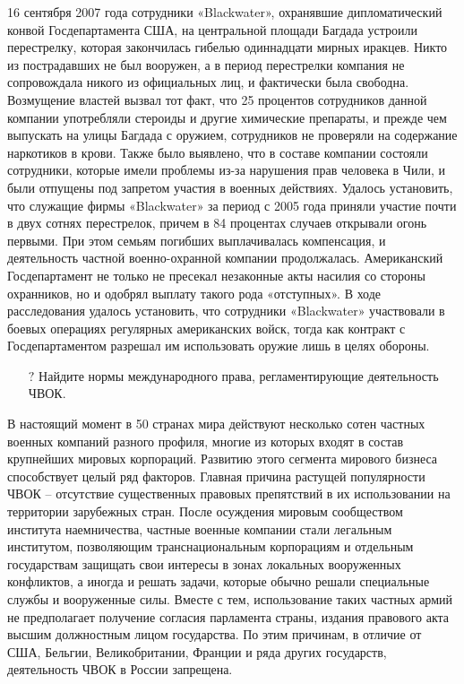 \documentclass[a4paper,12pt,fleqn]{article} %
\begin{document}
\begin{tcolorbox}[colback=blue!55!red!5!,colframe=blue!55!red,enforce breakable,%
	pad at break=1mm, title=Кейс 33. Действия частной компании в зоне конфликта]
	
	
  16 сентября 2007 года сотрудники «Blackwater», охранявшие дипломатический конвой Госдепартамента США, на центральной площади Багдада устроили перестрелку, которая закончилась гибелью одиннадцати мирных иракцев. Никто из пострадавших не был вооружен, а в период перестрелки компания не сопровождала никого из официальных лиц, и фактически была свободна. Возмущение властей вызвал тот факт, что 25 процентов сотрудников  данной компании употребляли стероиды и другие химические препараты, и прежде чем выпускать на улицы Багдада с оружием, сотрудников не проверяли на содержание наркотиков в крови. Также было выявлено, что в составе компании состояли сотрудники, которые имели проблемы из-за нарушения прав человека в Чили, и были отпущены под запретом участия в военных действиях. Удалось установить, что служащие фирмы «Blackwater» за период с 2005 года приняли участие почти в двух сотнях перестрелок, причем в 84 процентах случаев открывали огонь первыми. При этом семьям погибших выплачивалась компенсация, и деятельность частной военно-охранной компании продолжалась. Американский Госдепартамент не только не пресекал незаконные акты насилия со стороны охранников, но и одобрял выплату такого рода «отступных». В ходе расследования удалось установить, что сотрудники «Blackwater» участвовали в боевых операциях регулярных американских войск, тогда как контракт с Госдепартаментом разрешал им использовать оружие лишь в целях обороны.
	
	\begin{itemize}
		\item[{\color{blue!55!red}\Huge {  $ ? $}} \quad]   Найдите нормы международного права, регламентирующие деятельность ЧВОК.
	\end{itemize}	
	
\end{tcolorbox}

В настоящий момент в 50 странах мира действуют несколько сотен частных военных компаний разного профиля, многие из которых входят в состав крупнейших мировых корпораций. Развитию этого сегмента мирового бизнеса способствует целый ряд факторов. Главная причина растущей популярности ЧВОК – отсутствие существенных правовых препятствий в их использовании на территории зарубежных стран. После осуждения мировым сообществом института наемничества, частные военные компании стали легальным институтом, позволяющим транснациональным корпорациям и отдельным государствам защищать свои интересы в зонах локальных вооруженных конфликтов, а иногда и решать задачи, которые обычно решали специальные службы и вооруженные силы. Вместе с тем, использование таких частных армий не предполагает получение согласия парламента страны, издания правового акта высшим должностным лицом государства. По этим причинам, в отличие от США, Бельгии, Великобритании, Франции и ряда других государств, деятельность ЧВОК в России запрещена.
\end{document}

